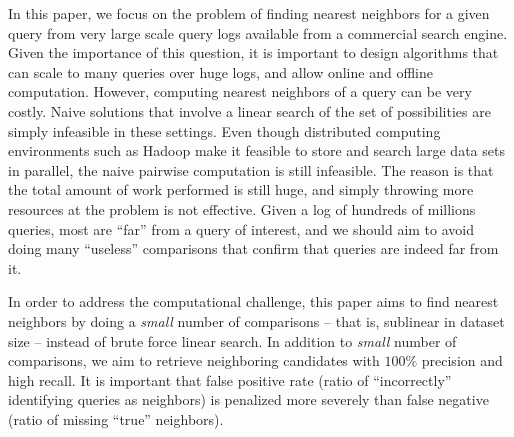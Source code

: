 In this paper, we focus on the problem of finding nearest neighbors
for a given query from very large scale query logs available from a commercial search engine. 
Given the importance of this question, it is important to design
algorithms that can scale to many queries over huge logs, and allow
online and offline computation. 
However, computing nearest neighbors of a query 
can be very costly. 
Naive solutions that involve a linear search of the set of possibilities
are simply infeasible in these settings. 
Even though distributed computing environments such as Hadoop
make it feasible to store and search large data sets in parallel, 
the naive pairwise computation is still infeasible. 
The reason is that the total amount of work performed is still huge,
and simply throwing more resources at the problem is not effective. 
Given a log of hundreds of millions queries, most are ``far'' from a
query of interest, and we should aim to avoid doing many ``useless''
comparisons that confirm that queries are indeed far from it. 

In order to address the computational challenge, this paper aims to find nearest neighbors by doing a 
\emph{small} number of comparisons -- that is, sublinear in dataset size -- instead of brute force linear search. 
In addition to \emph{small} number of comparisons, we aim to 
retrieve neighboring candidates with  $100\%$ precision and high recall.
It is important that false positive rate (ratio of  ``incorrectly'' identifying queries as neighbors) is penalized more severely than false negative (ratio of missing ``true'' neighbors).

